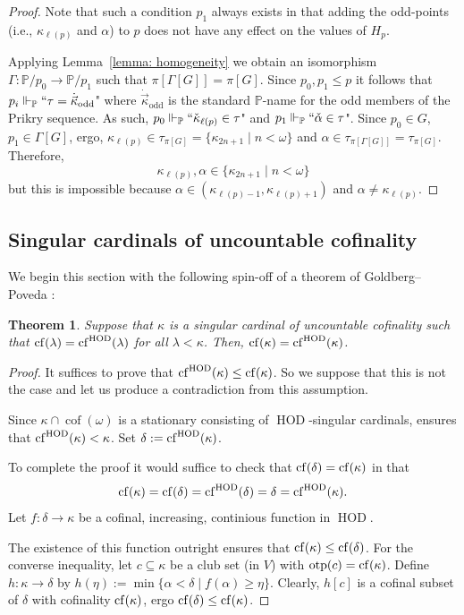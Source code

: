\documentclass[11pt]{amsart}
\newtheorem{theorem}{Theorem}[section]
\theoremstyle{definition}
\theoremstyle{remark}
\DeclareMathOperator{\cof}{cof}
\DeclareMathOperator{\HOD}{HOD}
\newcommand{\cf}{{\rm cf}}
\def\s{\subseteq}
\def\forces{\Vdash}
\begin{document}
\begin{proof}
  Note that such a condition $p_1$ always exists in that adding the odd-points (i.e., $\kappa_{\ell(p)}$ and $\alpha$) to $p$ does not have any effect on the values of $H_p$. 

    Applying Lemma~\ref{lemma: homogeneity} we obtain an isomorphism $\Gamma\colon \mathbb{P}/p_0\to \mathbb{P}/p_1$ such that $\pi[{\Gamma[G]}]=\pi[G]$. Since $p_0,p_1\leq p$ it follows that $p_i\forces_{\mathbb{P}} ``\tau=\dot{\vec{\kappa}}_{\mathrm{odd}}$" where $\dot{\vec{\kappa}}_{\mathrm{odd}}$ is the standard $\mathbb{P}$-name for the odd members of the Prikry sequence. As such, $p_0\forces_{\mathbb{P}}``\check{\kappa}_{\ell(p)}\in {\tau}$" and $p_1\forces_{\mathbb{P}}``\check{\alpha}\in {\tau}$". Since $p_0\in G$, $p_1\in \Gamma[G]$, ergo, $\kappa_{\ell(p)}\in \tau_{\pi[G]}=\{\kappa_{2n+1}\mid n<\omega\}$ and $\alpha\in \tau_{\pi[\Gamma[G]]}=\tau_{\pi[G]}$. Therefore,
    $$\kappa_{\ell(p)},\alpha\in\{\kappa_{2n+1}\mid n<\omega\}$$
    but this is impossible because $\alpha\in (\kappa_{\ell(p)-1},\kappa_{\ell(p)+1})$ and $\alpha\neq \kappa_{\ell(p)}$.
\end{proof}

\subsection{Singular cardinals of uncountable cofinality}\label{sec: compactness HOD singulars}

We begin this section with the following spin-off of a theorem of Goldberg--Poveda \cite{GolPov}:
\begin{theorem}\label{thm: spinoffGP}
 Suppose that $\kappa$ is a singular cardinal of uncountable cofinality such that $\cf(\lambda)=\cf^{\HOD}(\lambda)$ for all $\lambda < \kappa$. Then, $\cf(\kappa)=\cf^{\HOD}(\kappa)$.   
\end{theorem}
\begin{proof}
It suffices to prove that $\cf^{\HOD}(\kappa)\leq \cf(\kappa)$. So we  suppose that this is not the case and let us produce a contradiction from this assumption.

Since $\kappa\cap \cof(\omega)$ is a  stationary consisting of $\HOD$-singular cardinals, \cite[Theorem~3.5]{GolPov} ensures that  $\cf^{\HOD}(\kappa)<\kappa$. Set $\delta :=\cf^{\HOD}(\kappa)$. 

To complete the proof it would suffice to check that $\cf(\delta)=\cf(\kappa)$ in that
$$\cf(\kappa)=\cf(\delta)=\cf^{\HOD}(\delta)=\delta=\cf^{\HOD}(\kappa).$$
Let $f\colon \delta\to \kappa$ be a cofinal, increasing, continious function in $\HOD$.

The existence of this function outright ensures that $\cf(\kappa)\leq \cf(\delta)$. For the converse inequality, let $c\s \kappa$ be a club set (in $V$) with $\mathrm{otp}(c)=\cf(\kappa)$. Define $h\colon \kappa\to \delta$ by $h(\eta):=\min\{\alpha <\delta \mid f(\alpha)\geq \eta\}.$ Clearly, $h[c]$ is a cofinal subset of $\delta$ with cofinality $\cf(\kappa)$, ergo $\cf(\delta)\leq \cf(\kappa)$. 
\end{proof}
\end{document}
